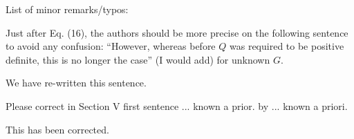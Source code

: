 \documentclass{article}
\newenvironment{review}[0]{\begin{itshape}\color{Gray}\noindent}{\end{itshape}\vspace{0.4cm}}
\newenvironment{response}[0]{\noindent}{\vspace{0.4cm}}
\begin{document}
\begin{review}
List of minor remarks/typos:

Just after Eq. (16), the authors should be more precise on the following sentence to avoid any confusion: ``However, whereas before $Q$ was required to be positive definite, this is no longer the case'' (I would add) for unknown $G$.
\end{review}

\begin{response}
 We have re-written this sentence. 
\end{response}

\begin{review}
Please correct in Section V first sentence ... known a prior. by ... known a priori.
\end{review}

\begin{response}
This has been corrected.
\end{response}
\end{document}
